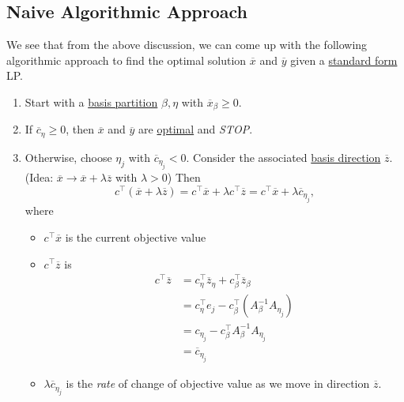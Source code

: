 \subsection{Naive Algorithmic Approach}
We see that from the above discussion, we can come up with the following algorithmic approach to find the optimal solution \(\overline{x} \) and \(\overline{y} \) given a
\hyperref[def:standard-form]{standard form} LP.
\begin{enumerate}
	\item Start with a \hyperref[def:basic-partition]{basis partition} \(\beta, \eta\) with \(\overline{x}_{\beta}\geq 0\).
	\item If \(\overline{c}_{\eta}\geq 0\), then \(\overline{x}\) and \(\overline{y}\) are \hyperref[def:optimal-solution]{optimal} and \emph{STOP}.
	\item Otherwise, choose \(\eta_j\) with \(\overline{c}_{\eta_j}<0\). Consider the associated \hyperref[def:basic-direction]{basis direction} \(\overline{z}\).
	      (Idea: \(\overline{x}\to \overline{x}+\lambda \overline{z}\) with \(\lambda >0\)) Then
	      \[
		      c^{\top}(\overline{x} + \lambda \overline{z}) = c^{\top} \overline{x} + \lambda c^{\top} \overline{z} = c^{\top} \overline{x} + \lambda \overline{c}_{\eta_j},
	      \]
	      where \begin{itemize}
		      \item \(c^{\top} \overline{x}\) is the current objective value
		      \item \(c^{\top}\overline{z}\) is
		            \[
			            \begin{split}
				            c^{\top}\overline{z} &= c_{\eta}^{\top} \overline{z}_{\eta}+c_{\beta}^{\top} \overline{z}_{\beta}\\
				            &=c_{\eta}^{\top}e_{j} - c_{\beta}^{\top}(A^{-1}_{\beta}A_{\eta_j})\\
				            &=c_{\eta_{j}} - c_{\beta}^{\top} A^{-1}_{\beta}A_{\eta_j}\\
				            &= \overline{c}_{\eta_{j}}
			            \end{split}
		            \]
		      \item \(\lambda \overline{c}_{\eta_{j}}\) is the \emph{rate} of change of objective value as we move in direction \(\overline{z}\).
	      \end{itemize}


\end{enumerate}
